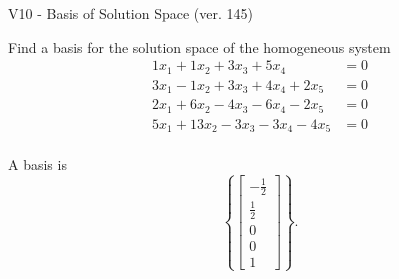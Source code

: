 \begin{exercise}
  \begin{exerciseTitle}V10 - Basis of Solution Space (ver. 145)\end{exerciseTitle}
  \begin{exerciseStatement}
    Find a basis for the solution space of the homogeneous system 
\begin{align*}
 1 x_ 1 + 1 x_ 2 + 3 x_ 3 + 5 x_ 4 &= 0  \\ 
  3 x_ 1 -1 x_ 2 + 3 x_ 3 + 4 x_ 4 + 2 x_ 5 &= 0  \\ 
  2 x_ 1 + 6 x_ 2 -4 x_ 3 -6 x_ 4 -2 x_ 5 &= 0  \\ 
  5 x_ 1 + 13 x_ 2 -3 x_ 3 -3 x_ 4 -4 x_ 5 &= 0  \\ 
 \end{align*}


 
  \end{exerciseStatement}

  \begin{exerciseAnswer}
   A basis is   
\[\left\{\left[\begin{array}{c}
-\frac{1}{2} \\
\frac{1}{2} \\
0 \\
0 \\
1
\end{array}\right]\right\}.\]

  


  \end{exerciseAnswer}
\end{exercise}